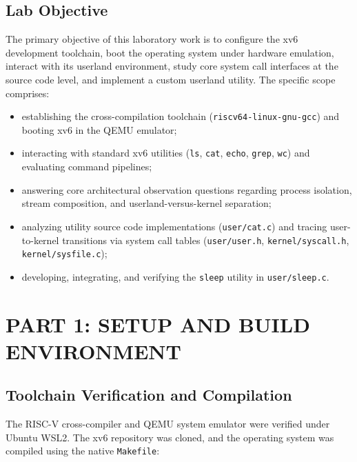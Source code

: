 \documentclass[12pt,a4paper]{report}
\numberwithin{equation}{chapter}
\numberwithin{figure}{chapter}
\numberwithin{table}{chapter}
\begin{document}
\section{Lab Objective}
The primary objective of this laboratory work is to configure the xv6 development toolchain, boot the operating system under hardware emulation, interact with its userland environment, study core system call interfaces at the source code level, and implement a custom userland utility. The specific scope comprises:
\begin{itemize}
    \item establishing the cross-compilation toolchain (\texttt{riscv64-linux-gnu-gcc}) and booting xv6 in the QEMU emulator;
    \item interacting with standard xv6 utilities (\texttt{ls}, \texttt{cat}, \texttt{echo}, \texttt{grep}, \texttt{wc}) and evaluating command pipelines;
    \item answering core architectural observation questions regarding process isolation, stream composition, and userland-versus-kernel separation;
    \item analyzing utility source code implementations (\texttt{user/cat.c}) and tracing user-to-kernel transitions via system call tables (\texttt{user/user.h}, \texttt{kernel/syscall.h}, \texttt{kernel/sysfile.c});
    \item developing, integrating, and verifying the \texttt{sleep} utility in \texttt{user/sleep.c}.
\end{itemize}

\chapter{PART 1: SETUP AND BUILD ENVIRONMENT}

\section{Toolchain Verification and Compilation}
The RISC-V cross-compiler and QEMU system emulator were verified under Ubuntu WSL2. The xv6 repository was cloned, and the operating system was compiled using the native \texttt{Makefile}:
\end{document}
